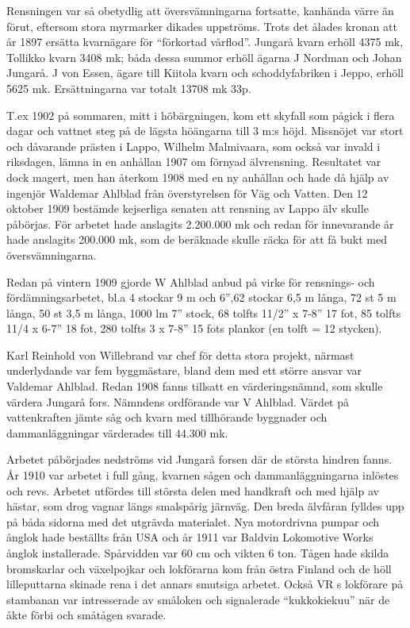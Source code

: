 Rensningen var så obetydlig att översvämningarna 	fortsatte, kanhända värre än förut, eftersom stora myrmarker dikades uppströms. Trots det ålades kronan att år 1897 ersätta kvarnägare för ``förkortad vårflod''. Jungarå kvarn erhöll 4375 mk, Tollikko kvarn 3408 mk; båda dessa summor erhöll ägarna J Nordman och Johan Jungarå. J von Essen, ägare till Kiitola kvarn och schoddyfabriken i Jeppo, erhöll 5625 mk. Ersättningarna var totalt 13708 mk 33p.

T.ex 1902 på sommaren, mitt i höbärgningen, kom ett skyfall som pågick i flera dagar och vattnet steg på de lägsta höängarna till 3 m:s höjd. Missnöjet var stort och dåvarande prästen i Lappo, Wilhelm Malmivaara, som också var invald i riksdagen, lämna in en anhållan 1907 om förnyad älvrensning. Resultatet var dock magert, men han återkom 1908 med en ny anhållan och hade då hjälp av ingenjör Waldemar Ahlblad från överstyrelsen 	för Väg och Vatten. Den 12 oktober 1909 bestämde kejserliga senaten att rensning av Lappo älv skulle påbörjas. För arbetet hade anslagits 2.200.000 mk och redan för innevarande år hade anslagits 200.000 mk, som de beräknade skulle räcka för att få bukt med översvämningarna.

Redan på vintern 1909 gjorde W Ahlblad anbud på virke för rensnings- och 	fördämningsarbetet, bl.a 4 stockar 9 m och 6”,62 stockar 6,5 m långa, 72 st 5 m långa, 50 st 3,5 m långa, 1000 lm 7” stock, 68 tolfts 11/2” x 7-8” 17 fot, 85 tolfts 11/4 x 6-7” 18 fot, 280 tolfts 3 x 7-8” 15 fots plankor (en tolft = 12 stycken).

Karl Reinhold von Willebrand var chef för detta stora projekt, närmast underlydande var fem byggmästare, bland dem med ett större ansvar var Valdemar Ahlblad. Redan 1908 fanns tillsatt en värderingsnämnd, som skulle värdera Jungarå fors. Nämndens ordförande var V Ahlblad. Värdet på vattenkraften jämte såg och kvarn med tillhörande byggnader och dammanläggningar värderades till 44.300 mk.


Arbetet påbörjades nedströms vid Jungarå forsen där de största 	hindren fanns. År 1910 var arbetet i full gång, kvarnen sågen och dammanläggningarna inlöstes och revs. Arbetet utfördes till största delen med handkraft och med hjälp av hästar, som drog vagnar längs smalspårig järnväg. Den breda älvfåran fylldes upp 	på båda sidorna med det utgrävda materialet. Nya motordrivna pumpar och ånglok hade beställts från USA och år 1911 var Baldvin Lokomotive Works ånglok installerade. Spårvidden var 60 cm och vikten 6 ton. Tågen hade skilda bromskarlar och växelpojkar och lokförarna kom från östra Finland och de höll lilleputtarna skinade rena i det annars smutsiga arbetet. Också VR s lokförare på stambanan var intresserade av småloken och 	signalerade ``kukkokiekuu'' när de åkte förbi och småtågen svarade.

